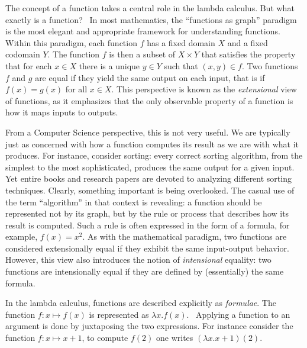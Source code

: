 


The concept of a function takes a central role in the lambda calculus. But what exactly is a function?  In most mathematics, the ``functions as graph'' paradigm is the most elegant and appropriate framework for understanding functions. Within this paradigm, each function $f$ has a fixed domain $X$ and a fixed codomain $Y$. The function $f$ is then a subset of $X \times Y$ that satisfies the property that for each $x \in X$ there is a unique $y \in Y$ such that $(x,y) \in f$. Two functions $f$ and $g$ are equal if they yield the same output on each input, that is if $f(x) = g(x)$ for all $x \in X$. This perspective is known as the \emph{extensional} view of functions, as it emphasizes that the only observable property of a function is how it maps inputs to outputs.

From a Computer Science perspective, this is not very useful. We are typically just as concerned with how a function computes its result as we are with what it produces. For instance, consider sorting: every correct sorting algorithm, from the simplest to the most sophisticated, produces the same output for a given input. Yet entire books and research papers are devoted to analyzing different sorting techniques. Clearly, something important is being overlooked. The casual use of the term ``algorithm'' in that context is revealing: a function should be represented not by its graph, but by the rule or process that describes how its result is computed. Such a rule is often expressed in the form of a formula, for example, \( f(x) = x^2 \). As with the mathematical paradigm, two functions are considered extensionally equal if they exhibit the same input-output behavior. However, this view also introduces the notion of \emph{intensional} equality: two functions are intensionally equal if they are defined by (essentially) the same formula.



In the lambda calculus, functions are described explicitly as \emph{formulae}. The function $f:x \mapsto f(x)$ is represented as $\lambda x.f(x)$.  Applying a function to an argument is done by juxtaposing the two expressions. For instance consider the function $f:x \mapsto x+1$, to compute $f(2)$ one writes $(\lambda x.x+1)(2)$.

